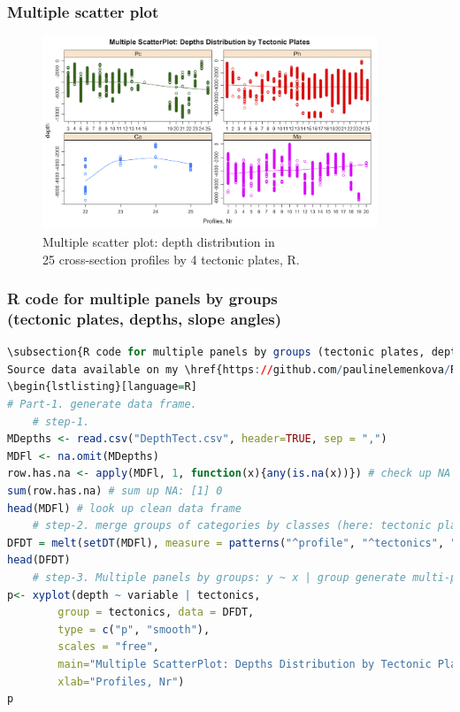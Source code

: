 \documentclass[pdflatex,compress,10pt,
	xcolor={dvipsnames,dvipsnames,svgnames,x11names,table},
	hyperref={colorlinks = true,breaklinks = true, urlcolor = NavyBlue, breaklinks = true}]{beamer}
\begin{document}
\begin{frame}\frametitle{Multiple scatter plot}
\begin{figure}[H]
	\centering
		\includegraphics[width=10cm]{Fig-3-4.jpg}\caption{Multiple scatter plot: depth distribution in \\25 cross-section profiles by 4 tectonic plates, R.}
\end{figure}		
\end{frame}

\begin{frame}[fragile]\frametitle{R code for multiple panels by groups \\(tectonic plates, depths, slope angles)}
\begin{lstlisting}[language=R]
\subsection{R code for multiple panels by groups (tectonic plates, depths, slope angles)}\label{R:18}
Source data available on my \href{https://github.com/paulinelemenkova/R-17-Multiple-panels-by-groups}{GitHub}.
\begin{lstlisting}[language=R]
# Part-1. generate data frame. 
	# step-1.
MDepths <- read.csv("DepthTect.csv", header=TRUE, sep = ",")
MDFl <- na.omit(MDepths) 
row.has.na <- apply(MDFl, 1, function(x){any(is.na(x))}) # check up NA
sum(row.has.na) # sum up NA: [1] 0
head(MDFl) # look up clean data frame	
	# step-2. merge groups of categories by classes (here: tectonic plates, depths, slope angles)
DFDT = melt(setDT(MDFl), measure = patterns("^profile", "^tectonics", "^tg"), value.name = c("depth", "tectonics", "trench_angle"))
head(DFDT)
	# step-3. Multiple panels by groups: y ~ x | group generate multi-plot
p<- xyplot(depth ~ variable | tectonics, 
		group = tectonics, data = DFDT,
		type = c("p", "smooth"),
		scales = "free",
		main="Multiple ScatterPlot: Depths Distribution by Tectonic Plates",
		xlab="Profiles, Nr")
p
\end{lstlisting}
\end{frame}
\end{document}
